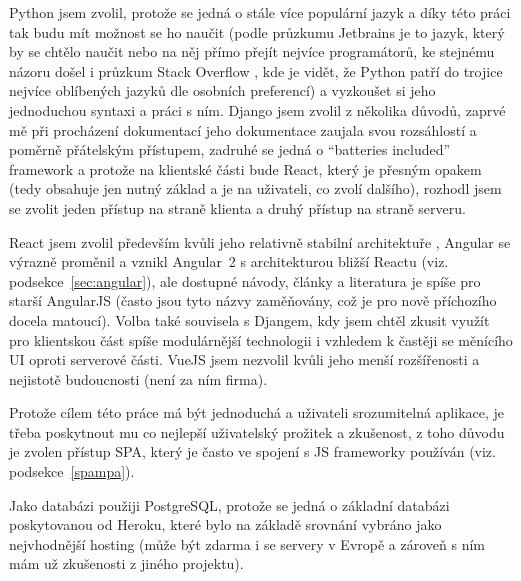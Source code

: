     Python jsem zvolil, protože se jedná o stále více populární jazyk a díky této práci tak budu mít možnost se ho naučit (podle průzkumu Jetbrains \cite{jetbrains-stats} je to jazyk, který by se chtělo naučit nebo na něj přímo přejít nejvíce programátorů, ke stejnému názoru došel i průzkum Stack Overflow \cite{stack-stats18}, kde je vidět, že Python patří do trojice nejvíce oblíbených jazyků dle osobních preferencí) a vyzkoušet si jeho jednoduchou syntaxi a práci s ním. Django jsem zvolil z několika důvodů, zaprvé mě při procházení dokumentací jeho dokumentace zaujala svou rozsáhlostí a poměrně přátelským přístupem, zadruhé se jedná o \enquote{batteries included} framework a protože na klientské části bude React, který je přesným opakem (tedy obsahuje jen nutný základ a je na uživateli, co zvolí dalšího), rozhodl jsem se zvolit jeden přístup na straně klienta a druhý přístup na straně serveru.
    
    React jsem zvolil především kvůli jeho relativně stabilní architektuře \cite{js-fw2}, Angular se výrazně proměnil a vznikl Angular~2 s architekturou bližší Reactu (viz. podsekce~\ref{sec:angular}), ale dostupné návody, články a literatura je spíše pro starší AngularJS (často jsou tyto názvy zaměňovány, což je pro nově příchozího docela matoucí). Volba také souvisela s Djangem, kdy jsem chtěl zkusit využít pro klientskou část spíše modulárnější technologii i vzhledem k častěji se měnícího UI oproti serverové části. VueJS jsem nezvolil kvůli jeho menší rozšířenosti a nejistotě budoucnosti (není za ním firma).
    
    Protože cílem této práce má být jednoduchá a uživateli srozumitelná aplikace, je třeba poskytnout mu co nejlepší uživatelský prožitek a zkušenost, z toho důvodu je zvolen přístup SPA, který je často ve spojení s JS frameworky používán (viz. podsekce~\ref{spampa}).
    
    Jako databázi použiji PostgreSQL, protože se jedná o základní databázi poskytovanou od Heroku, které bylo na základě srovnání vybráno jako nejvhodnější hosting (může být zdarma i se servery v Evropě a zároveň s ním mám už zkušenosti z jiného projektu).